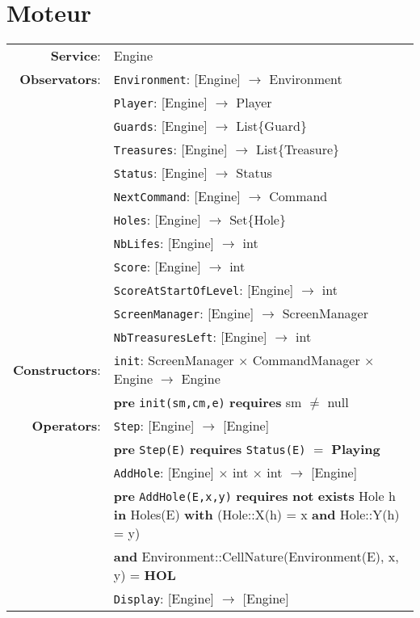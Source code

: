 \documentclass[7pt]{article}
\begin{document}
\newpage

\section*{Moteur}

\begin{tabular}{rl}
\textbf{Service}: & \textrm{Engine} \\
{\textbf{Observators}}: &\texttt{Environment}: \textrm{[Engine]}  $\rightarrow$ \textrm{Environment}  \\
&\texttt{Player}: \textrm{[Engine]}  $\rightarrow$ \textrm{Player}  \\
&\texttt{Guards}: \textrm{[Engine]}  $\rightarrow$ \textrm{List\{Guard\}}  \\
&\texttt{Treasures}: \textrm{[Engine]}  $\rightarrow$ \textrm{List\{Treasure\}}  \\
&\texttt{Status}: \textrm{[Engine]}  $\rightarrow$ \textrm{Status}  \\
&\texttt{NextCommand}: \textrm{[Engine]}  $\rightarrow$ \textrm{Command}  \\
&\texttt{Holes}: \textrm{[Engine]}  $\rightarrow$ \textrm{Set\{Hole\}}  \\
&\texttt{NbLifes}: \textrm{[Engine]}  $\rightarrow$ \textrm{int}  \\
&\texttt{Score}: \textrm{[Engine]}  $\rightarrow$ \textrm{int}  \\
&\texttt{ScoreAtStartOfLevel}: \textrm{[Engine]}  $\rightarrow$ \textrm{int}  \\
&\texttt{ScreenManager}: \textrm{[Engine]}  $\rightarrow$ \textrm{ScreenManager}  \\
&\texttt{NbTreasuresLeft}: \textrm{[Engine]}  $\rightarrow$ \textrm{int}  \\

\textbf{Constructors}: & \texttt{init}: \textrm{ScreenManager} $\times$ \textrm{CommandManager} $\times$ \textrm{Engine}  $\rightarrow$ \textrm{Engine} \\
& \quad\quad \textbf{pre} \texttt{init(sm,cm,e)} \textbf{requires} sm $\neq$ null \\


\textbf{Operators}: & \texttt{Step}: \textrm{[Engine]} $\rightarrow$ \textrm{[Engine]}\\
& \quad\quad \textbf{pre} \texttt{Step(E)} \textbf{requires} \texttt{Status(E)} $=$ \textbf{Playing} \\
& \texttt{AddHole}: \textrm{[Engine]} $\times$ \textrm{int} $\times$ \textrm{int} $\rightarrow$ \textrm{[Engine]}\\
& \quad\quad \textbf{pre} \texttt{AddHole(E,x,y)} \textbf{requires} \textbf{not} \textbf{exists} Hole h \textbf{in} Holes(E) \textbf{with} (Hole::X(h) = x \textbf{and} Hole::Y(h) = y) \\ & \quad\quad\quad \textbf{and} Environment::CellNature(Environment(E), x, y) = \textbf{HOL}\\
& \texttt{Display}: \textrm{[Engine]} $\rightarrow$ \textrm{[Engine]}\\


\end{tabular}
\end{document}
